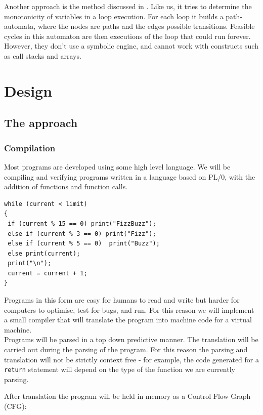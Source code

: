 \documentclass[12pt,a4paper]{article}
\begin{document}
\begin{enumerate}
Another approach is the method discussed in \cite{loopster}. Like us, it tries to determine the monotonicity of variables in a loop execution. For each loop it builds a path-automata, where the nodes are paths and the edges possible transitions. Feasible cycles in this automaton are then executions of the loop that could run forever.
However, they don't use a symbolic engine, and cannot work with constructs such as call stacks and arrays.


\section{Design}
\subsection{The approach}
\subsubsection{Compilation}
Most programs are developed using some high level language. We will be compiling and verifying programs written in a language based on PL/0, with the addition
of functions and function calls.

\begin{lstlisting}[frame=tlrb,language=myLang, caption=Fizzbuzz., label={fizzbuzz}]
while (current < limit)
{
 if (current % 15 == 0) print("FizzBuzz");
 else if (current % 3 == 0) print("Fizz");
 else if (current % 5 == 0)  print("Buzz");
 else print(current);
 print("\n");
 current = current + 1;
}
\end{lstlisting}

Programs in this form are easy for humans to read and write but harder for computers to optimise, test for bugs, and run. For this reason we will implement a small compiler that will translate the program into machine
code for a virtual machine.\\
Programs will be parsed in a top down predictive manner. The translation will be carried out during the parsing of the program. For this reason the parsing and translation will not be strictly context free - for example, the code generated
for a \texttt{return} statement will depend on the type of the function we are currently parsing.\\\par

 After translation the program will be held in memory as a Control Flow Graph (CFG):
 

\end{enumerate}
\end{document}
